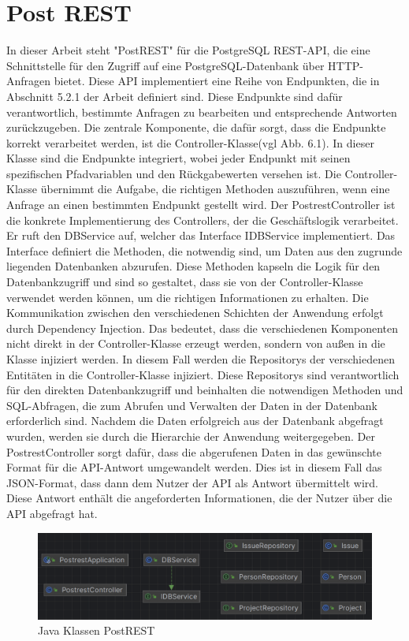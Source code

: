 
\section{Post REST} %
\label{sec:postrest}
In dieser Arbeit steht "PostREST" für die PostgreSQL REST-API, die eine Schnittstelle für den Zugriff auf eine PostgreSQL-Datenbank über HTTP-Anfragen bietet. Diese API implementiert eine Reihe von Endpunkten, die in Abschnitt 5.2.1 der Arbeit definiert sind. Diese Endpunkte sind dafür verantwortlich, bestimmte Anfragen zu bearbeiten und entsprechende Antworten zurückzugeben.
\noindent
Die zentrale Komponente, die dafür sorgt, dass die Endpunkte korrekt verarbeitet werden, ist die Controller-Klasse(vgl Abb. 6.1). In dieser Klasse sind die Endpunkte integriert, wobei jeder Endpunkt mit seinen spezifischen Pfadvariablen und den Rückgabewerten versehen ist. Die Controller-Klasse übernimmt die Aufgabe, die richtigen Methoden auszuführen, wenn eine Anfrage an einen bestimmten Endpunkt gestellt wird.
\noindent
Der PostrestController ist die konkrete Implementierung des Controllers, der die Geschäftslogik verarbeitet. Er ruft den DBService auf, welcher das Interface IDBService implementiert. Das Interface definiert die Methoden, die notwendig sind, um Daten aus den zugrunde liegenden Datenbanken abzurufen. Diese Methoden kapseln die Logik für den Datenbankzugriff und sind so gestaltet, dass sie von der Controller-Klasse verwendet werden können, um die richtigen Informationen zu erhalten.
\noindent
Die Kommunikation zwischen den verschiedenen Schichten der Anwendung erfolgt durch Dependency Injection. Das bedeutet, dass die verschiedenen Komponenten nicht direkt in der Controller-Klasse erzeugt werden, sondern von außen in die Klasse injiziert werden. In diesem Fall werden die Repositorys der verschiedenen Entitäten in die Controller-Klasse injiziert. Diese Repositorys sind verantwortlich für den direkten Datenbankzugriff und beinhalten die notwendigen Methoden und SQL-Abfragen, die zum Abrufen und Verwalten der Daten in der Datenbank erforderlich sind.
\noindent
Nachdem die Daten erfolgreich aus der Datenbank abgefragt wurden, werden sie durch die Hierarchie der Anwendung weitergegeben. Der PostrestController sorgt dafür, dass die abgerufenen Daten in das gewünschte Format für die API-Antwort umgewandelt werden. Dies ist in diesem Fall das JSON-Format, dass dann dem Nutzer der API als Antwort übermittelt wird. Diese Antwort enthält die angeforderten Informationen, die der Nutzer über die API abgefragt hat.
\begin{figure}[H]
	\centering
	\includegraphics[scale=0.5]{Illustrations/postrest.png}
	\caption{Java Klassen PostREST}
\end{figure}

